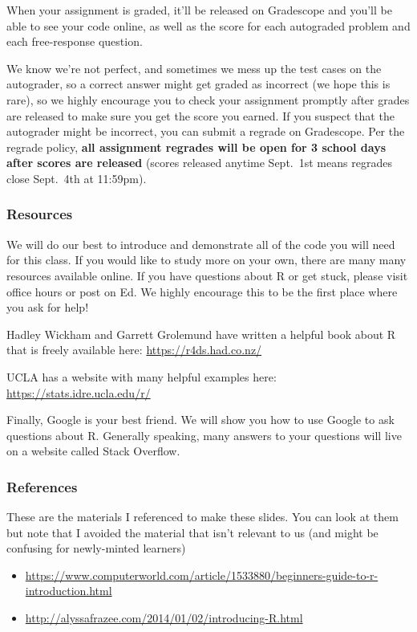 \documentclass[
]{article}
\begin{document}
When your assignment is graded, it'll be released on Gradescope and
you'll be able to see your code online, as well as the score for each
autograded problem and each free-response question.

We know we're not perfect, and sometimes we mess up the test cases on
the autograder, so a correct answer might get graded as incorrect (we
hope this is rare), so we highly encourage you to check your assignment
promptly after grades are released to make sure you get the score you
earned. If you suspect that the autograder might be incorrect, you can
submit a regrade on Gradescope. Per the regrade policy, \textbf{all
assignment regrades will be open for 3 school days after scores are
released} (scores released anytime Sept.~1st means regrades close
Sept.~4th at 11:59pm).

\subsubsection{Resources}\label{resources}

We will do our best to introduce and demonstrate all of the code you
will need for this class. If you would like to study more on your own,
there are many many resources available online. If you have questions
about R or get stuck, please visit office hours or post on Ed. We highly
encourage this to be the first place where you ask for help!

Hadley Wickham and Garrett Grolemund have written a helpful book about R
that is freely available here: \url{https://r4ds.had.co.nz/}

UCLA has a website with many helpful examples here:
\url{https://stats.idre.ucla.edu/r/}

Finally, Google is your best friend. We will show you how to use Google
to ask questions about R. Generally speaking, many answers to your
questions will live on a website called Stack Overflow.

\newpage

\subsubsection{References}\label{references}

These are the materials I referenced to make these slides. You can look
at them but note that I avoided the material that isn't relevant to us
(and might be confusing for newly-minted learners)

\begin{itemize}
\item
  \url{https://www.computerworld.com/article/1533880/beginners-guide-to-r-introduction.html}
\item
  \url{http://alyssafrazee.com/2014/01/02/introducing-R.html}
\end{itemize}
\end{document}
